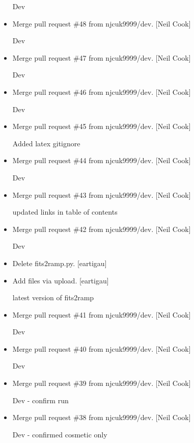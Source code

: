 \documentclass[a4paper,10pt,english]{report}
\begin{document}
\begin{itemize}
Dev

\item {} 
Merge pull request \#48 from njcuk9999/dev. {[}Neil Cook{]}

Dev

\item {} 
Merge pull request \#47 from njcuk9999/dev. {[}Neil Cook{]}

Dev

\item {} 
Merge pull request \#46 from njcuk9999/dev. {[}Neil Cook{]}

Dev

\item {} 
Merge pull request \#45 from njcuk9999/dev. {[}Neil Cook{]}

Added latex gitignore

\item {} 
Merge pull request \#44 from njcuk9999/dev. {[}Neil Cook{]}

Dev

\item {} 
Merge pull request \#43 from njcuk9999/dev. {[}Neil Cook{]}

updated links in table of contents

\item {} 
Merge pull request \#42 from njcuk9999/dev. {[}Neil Cook{]}

Dev

\item {} 
Delete fits2ramp.py. {[}eartigau{]}

\item {} 
Add files via upload. {[}eartigau{]}

latest version of fits2ramp

\item {} 
Merge pull request \#41 from njcuk9999/dev. {[}Neil Cook{]}

Dev

\item {} 
Merge pull request \#40 from njcuk9999/dev. {[}Neil Cook{]}

Dev

\item {} 
Merge pull request \#39 from njcuk9999/dev. {[}Neil Cook{]}

Dev - confirm run

\item {} 
Merge pull request \#38 from njcuk9999/dev. {[}Neil Cook{]}

Dev - confirmed cosmetic only


\end{itemize}
\end{document}
